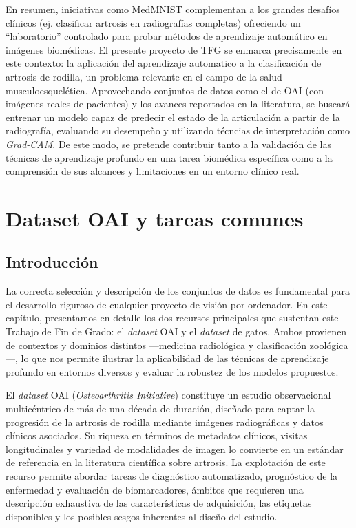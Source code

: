 \documentclass[11pt,spanish,listoffigures,listoftables]{tfgetsinf}
\begin{document}
En resumen, iniciativas como MedMNIST complementan a los grandes desafíos clínicos (ej. clasificar artrosis en radiografías 
completas) ofreciendo un “laboratorio” controlado para probar métodos de aprendizaje automático en imágenes biomédicas. 
El presente proyecto de TFG se enmarca precisamente en este contexto: la aplicación del aprendizaje automatico 
a la clasificación de artrosis de rodilla, un problema relevante en el campo de la salud musculoesquelética. 
Aprovechando conjuntos de datos como el de OAI \cite{chen2018knee} (con imágenes reales de pacientes) y los avances reportados 
en la literatura, se buscará entrenar un modelo capaz de predecir el estado de la articulación a partir de la radiografía, evaluando su desempeño 
y utilizando técncias de interpretación como \textit{Grad-CAM}. De este modo, se pretende contribuir tanto a la validación de las 
técnicas de aprendizaje profundo en una tarea biomédica específica como a la comprensión de sus alcances y limitaciones en 
un entorno clínico real.




\chapter{Dataset OAI y tareas comunes}
\label{chap:corpus}

\section{Introducción}
\label{sec:3_1_introduccion}

La correcta selección y descripción de los conjuntos de datos es fundamental para el desarrollo riguroso de cualquier proyecto de visión por ordenador. En este capítulo, 
presentamos en detalle los dos recursos principales que sustentan este Trabajo de Fin de Grado: el \emph{dataset} OAI y el \emph{dataset} de gatos. Ambos provienen de 
contextos y dominios distintos —medicina radiológica y clasificación zoológica—, lo que nos permite ilustrar la aplicabilidad de las técnicas de aprendizaje profundo en 
entornos diversos y evaluar la robustez de los modelos propuestos.

El \emph{dataset} OAI (\emph{Osteoarthritis Initiative}) constituye un estudio observacional multicéntrico de más de una década de duración, diseñado para captar la 
progresión de la artrosis de rodilla mediante imágenes radiográficas y datos clínicos asociados. Su riqueza en términos de metadatos clínicos, visitas longitudinales 
y variedad de modalidades de imagen lo convierte en un estándar de referencia en la literatura científica sobre artrosis. La explotación de este recurso permite abordar 
tareas de diagnóstico automatizado, prognóstico de la enfermedad y evaluación de biomarcadores, ámbitos que requieren una descripción exhaustiva de las características 
de adquisición, las etiquetas disponibles y los posibles sesgos inherentes al diseño del estudio.
\end{document}
